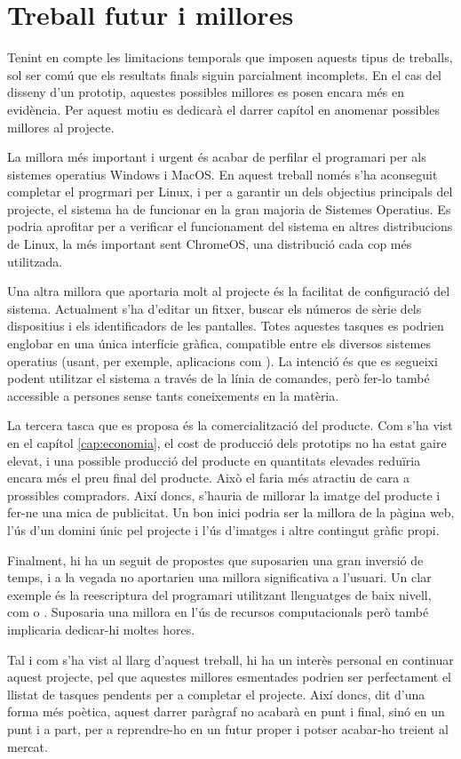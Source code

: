 \chapter{Treball futur i millores}
\label{cap:future_work}

Tenint en compte les limitacions temporals que imposen aquests tipus de
treballs, sol ser comú que els resultats finals siguin parcialment incomplets.
En el cas del disseny d'un prototip, aquestes possibles millores es posen encara
més en evidència. Per aquest motiu es dedicarà el darrer capítol en anomenar
possibles millores al projecte.

La millora més important i urgent és acabar de perfilar el programari per als
sistemes operatius Windows i MacOS. En aquest treball només s'ha aconseguit
completar el progrmari per Linux, i per a garantir un dels objectius principals
del projecte, el sistema ha de funcionar en la gran majoria de Sistemes
Operatius. Es podria aprofitar per a verificar el funcionament del sistema en
altres distribucions de Linux, la més important sent ChromeOS, una distribució
cada cop més utilitzada.

Una altra millora que aportaria molt al projecte és la facilitat de
configuració del sistema. Actualment s'ha d'editar un fitxer, buscar els números
de sèrie dels dispositius i els identificadors de les pantalles. Totes aquestes
tasques es podrien englobar en una única interfície gràfica, compatible entre
els diversos sistemes operatius (usant, per exemple, aplicacions com
). La intenció és que es segueixi podent utilitzar el sistema a
través de la línia de comandes, però fer-lo també accessible a persones sense
tants coneixements en la matèria.

La tercera tasca que es proposa és la comercialització del producte.
Com s'ha vist en el capítol \ref{cap:economia}, el cost de producció dels
prototips no ha estat gaire elevat, i una possible producció del producte en
quantitats elevades reduïria encara més el preu final del producte. Això el
faria més atractiu de cara a prossibles compradors. Així doncs, s'hauria de
millorar la imatge del producte i fer-ne una mica de publicitat. Un bon inici
podria ser la millora de la pàgina web, l'ús d'un domini únic pel projecte
i l'ús d'imatges i altre contingut gràfic propi.

Finalment, hi ha un seguit de propostes que suposarien una gran inversió de
temps, i a la vegada no aportarien una millora significativa a l'usuari. Un clar
exemple és la reescriptura del programari utilitzant llenguatges de baix nivell,
com  o . Suposaria una millora en l'ús de recursos
computacionals però també implicaria dedicar-hi moltes hores.

Tal i com s'ha vist al llarg d'aquest treball, hi ha un interès personal en
continuar aquest projecte, pel que aquestes millores esmentades podrien ser
perfectament el llistat de tasques pendents per a completar el projecte.
Així doncs, dit d'una forma més poètica, aquest darrer paràgraf no acabarà en
punt i final, sinó en un punt i a part, per a reprendre-ho en un futur proper
i potser acabar-ho treient al mercat.
